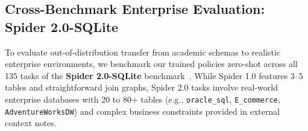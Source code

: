 \documentclass{article}
\theoremstyle{plain}
\theoremstyle{definition}
\theoremstyle{remark}
\begin{document}
\subsection{Cross-Benchmark Enterprise Evaluation: Spider 2.0-SQLite}
\label{sec:spider2_eval}

To evaluate out-of-distribution transfer from academic schemas to realistic enterprise environments, we benchmark our trained policies zero-shot across all 135 tasks of the \textbf{Spider 2.0-SQLite} benchmark~\citep{yang2026harnesssql}. While Spider 1.0 features 3--5 tables and straightforward join graphs, Spider 2.0 tasks involve real-world enterprise databases with 20 to 80+ tables (e.g., \texttt{oracle\_sql}, \texttt{E\_commerce}, \texttt{AdventureWorksDW}) and complex business constraints provided in external context notes.

\begin{table}[h]
\centering
\small
\caption{\textbf{Zero-Shot Cross-Benchmark Evaluation on Spider 2.0-SQLite ($N=135$ Tasks).} Comparing Baseline Harness-Zero GRPO, DAPO, and GSPO under Best-of-3 Trajectory Verification ($T=0.7$, Max 5 turns).}
\label{tab:spider2_benchmark}
\vskip 0.1in
\end{table}
\end{document}
